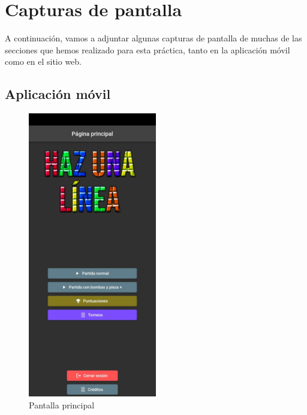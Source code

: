 \documentclass{article}
\begin{document}
\section{Capturas de pantalla}
A continuación, vamos a adjuntar algunas capturas de pantalla de muchas de las secciones que hemos realizado para esta práctica, tanto en la aplicación móvil como en el sitio web.
\subsection{Aplicación móvil}
\begin{figure}[H]
  \centering
  \includegraphics[width=0.5\textwidth]{imagenes/inicio.jpeg}
  \caption{Pantalla principal} 
\end{figure} 
\end{document}
